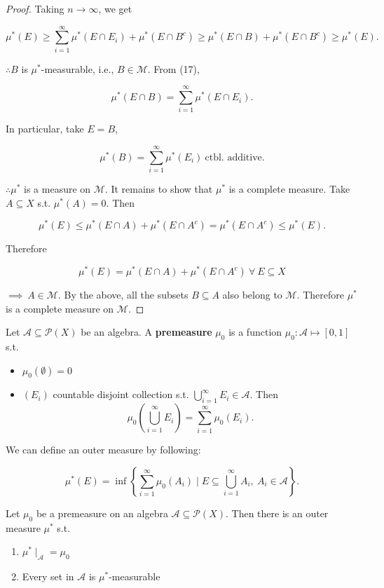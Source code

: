 \documentclass{functionspaces}
\begin{document}
\begin{proof}
Taking $n \to \infty$, we get

\[
\mu^{*}(E) \geq \sum_{i=1}^{\infty} \mu^{*}(E \cap E_{i}) + \mu^{*}(E \cap B^{c}) \geq \mu^{*}(E \cap B) + \mu^{*}(E \cap B^{c}) \geq \mu^{*}(E). \tag{17}
\]

$\therefore B$ is $\mu^{*}$-measurable, i.e., $B \in \mathcal{M}$. From (17),

\[
\mu^{*}(E \cap B) = \sum_{i=1}^{\infty} \mu^{*}(E \cap E_{i}).
\]

In particular, take $E = B$,

\[
\mu^{*}(B) = \sum_{i=1}^{\infty} \mu^{*}(E_{i})\ \text{ctbl. additive}.
\]

$\therefore \mu^{*}$ is a measure on $\mathcal{M}$. It remains to show that $\mu^{*}$ is a complete measure. Take $A \subseteq X$ s.t. $\mu^{*}(A) = 0$. Then

\[
\mu^{*}(E) \leq \mu^{*}(E \cap A) + \mu^{*}(E \cap A^{c}) = \mu^{*}(E \cap A^{c}) \leq \mu^{*}(E).
\]

Therefore

\[
\mu^{*}(E) = \mu^{*}(E \cap A) + \mu^{*}(E \cap A^{c})\ \forall\ E \subseteq X
\]

$\implies\ A \in \mathcal{M}.$ By the above, all the subsets $B \subseteq A$ also belong to $\mathcal{M}.$ Therefore $\mu^{*}$ is a complete measure on $\mathcal{M}$.
\end{proof}

\begin{definition}[Premeasure]
Let $\mathcal{A} \subseteq \mathcal{P}(X)$ be an algebra. A \textbf{premeasure} $\mu_{0}$ is a function $\mu_{0} : \mathcal{A} \mapsto [0,1]$ s.t.

\begin{itemize}
    \item $\mu_{0}(\emptyset) = 0$
    \item $(E_{i})$ countable disjoint collection s.t. $\bigcup_{i=1}^{\infty} E_{i} \in \mathcal{A}.$ Then
    \[
    \mu_{0}\left(\bigcup_{i=1}^{\infty} E_{i}\right) = \sum_{i=1}^{\infty} \mu_{0}(E_{i}).
    \]
\end{itemize}

We can define an outer measure by following:

\[
\mu^{*}(E) = \inf\left\{\sum_{i=1}^{\infty} \mu_{0}(A_{i}) \mid E \subseteq \bigcup_{i=1}^{\infty} A_{i},\ A_{i} \in \mathcal{A}\right\}.
\]
\end{definition}

\begin{proposition}
Let $\mu_{0}$ be a premeasure on an algebra $\mathcal{A} \subseteq \mathcal{P}(X).$ Then there is an outer measure $\mu^{*}$ s.t.

\begin{enumerate}
    \item $\mu^{*} \mid_{\mathcal{A}} = \mu_{0}$
    \item Every set in $\mathcal{A}$ is $\mu^{*}$-measurable
\end{enumerate}
\end{proposition}
\end{document}
